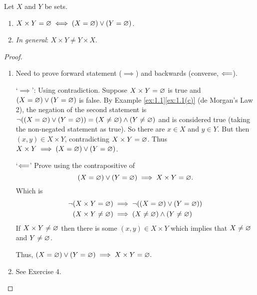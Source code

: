 \begin{proposition}
    Let $X$ and $Y$ be sets.

    \begin{enumerate}[label=(\roman*)]
        \item $X \times Y = \varnothing \iff (X = \varnothing) \lor (Y = \varnothing)$.
        \item \textit{In general}: $X \times Y \neq Y \times X$.
    \end{enumerate}

    \begin{proof}
        \begin{enumerate}[label=(\roman*)]
            \item Need to prove forward statement ($\implies$) and backwards (converse, $\Longleftarrow$).

                `$\implies$': Using contradiction. Suppose $X \times Y = \varnothing$ is true and $(X = \varnothing) \lor (Y = \varnothing)$ is false. By Example \ref{ex:1.1}\ref{ex:1.1(c)} (de Morgan's Law 2), the negation of the second statement is $\neg((X = \varnothing) \lor (Y = \varnothing)) = (X \neq \varnothing) \land (Y \neq \varnothing)$ and is considered true (taking the non-negated statement as true). So there are $x \in X$ and $y \in Y$. But then $(x,y) \in X \times Y$, contradicting $X \times Y = \varnothing$. Thus $X \times Y \implies (X = \varnothing) \lor (Y = \varnothing)$.

                `$\Longleftarrow$' Prove using the contrapositive of
                $$
                (X = \varnothing) \lor (Y = \varnothing) \implies X \times Y = \varnothing.
                $$
                \noindent Which is
                \begin{align*}
                    \neg(X \times Y = \varnothing) &\implies \neg((X = \varnothing) \lor (Y = \varnothing)) \\
                    (X \times Y \neq \varnothing) &\implies (X \neq \varnothing) \land (Y \neq \varnothing)
                \end{align*}
                \noindent If $X \times Y \neq \varnothing$ then there is some $(x,y) \in X \times Y$ which implies that $X \neq \varnothing$ and $Y \neq \varnothing$.

                Thus, $(X = \varnothing) \lor (Y = \varnothing) \implies X \times Y = \varnothing.$
                
                \item See Exercise 4.
        \end{enumerate}
    \end{proof}
\end{proposition}


